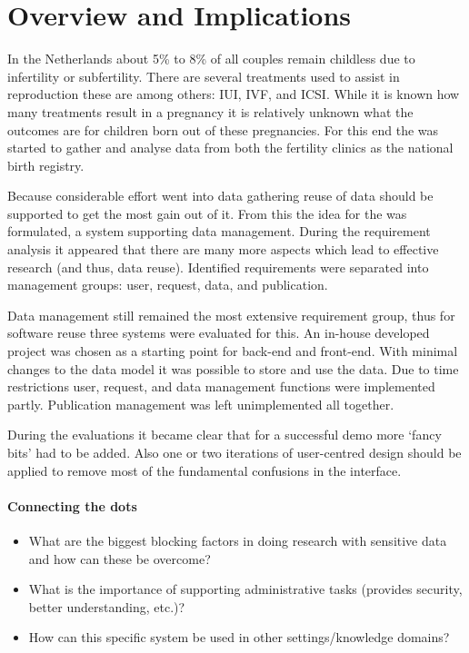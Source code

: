 \section{Overview and Implications}

In the Netherlands about 5\% to 8\% of all couples remain childless due to infertility or subfertility.
There are several treatments used to assist in reproduction these are among others: IUI, IVF, and ICSI.
While it is known how many treatments result in a pregnancy it is relatively unknown what the outcomes are for children born out of these pregnancies.
For this end the \project{} was started to gather and analyse data from both the fertility clinics as the national birth registry.

Because considerable effort went into data gathering reuse of data should be supported to get the most gain out of it.
From this the idea for the \ivfsystem{} was formulated, a system supporting data management.
During the requirement analysis it appeared that there are many more aspects which lead to effective research (and thus, data reuse).
Identified requirements were separated into management groups: user, request, data, and publication.

Data management still remained the most extensive requirement group, thus for software reuse three systems were evaluated for this.
An in-house developed project was chosen as a starting point for back-end and front-end.
With minimal changes to the data model it was possible to store and use the \project{} data.
Due to time restrictions user, request, and data management functions were implemented partly.
Publication management was left unimplemented all together.

During the evaluations it became clear that for a successful demo more `fancy bits' had to be added.
Also one or two iterations of user-centred design should be applied to remove most of the fundamental confusions in the interface.

\paragraph{Connecting the dots}
\begin{itemize}
	\item What are the biggest blocking factors in doing research with sensitive data and how can these be overcome?
	\item What is the importance of supporting administrative tasks (provides security, better understanding, etc.)? 
	\item How can this specific system be used in other settings/knowledge domains?
\end{itemize}
